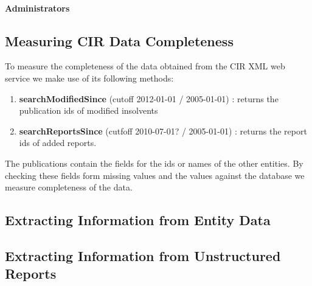 

\paragraph{Administrators}

\subsection{Measuring CIR Data Completeness}
To measure the completeness of the data obtained from the CIR XML web service we make use of its following methods\cite{rechtspraak:tech-docs}:
\begin{enumerate}
\item \textbf{searchModifiedSince} (cutoff 2012-01-01 / 2005-01-01) : returns the publication ids of modified insolvents
\item \textbf{searchReportsSince} (cutfoff 2010-07-01? / 2005-01-01) : returns the report ids of added reports.
\end{enumerate}

The publications contain the fields for the ids or names of the other entities. By checking these fields form missing values and the values against the database we measure completeness of the data.

\subsection{Extracting Information from Entity Data}
\subsection{Extracting Information from Unstructured Reports}


